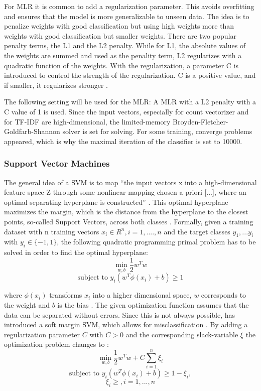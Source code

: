 \documentclass[12pt, a4paper, titlepage]{article}
\begin{document}
For \ac{MLR} it is common to add a regularization parameter. This avoids overfitting and ensures that the model is more generalizable to unseen data. The idea is to penalize weights with good classification but using high weights more than weights with good classification but smaller weights. There are two popular penalty terms, the L1 and the L2 penalty. While for L1, the absolute values of the weights are summed and used as the penality term, L2 regularizes with a quadratic function of the weights. With the regularization, a parameter C is introduced to control the strength of the regularization. C is a positive value, and if smaller, it regularizes stronger \citep{jurafsky2021}. 

The following setting will be used for the \ac{MLR}: A \ac{MLR} with a L2 penalty with a C value of 1 is used. Since the input vectors, especially for count vectorizer and for \ac{TF-IDF} are high-dimensional, the limited-memory Broyden-Fletcher-Goldfarb-Shannon solver is set for solving. For some training, converge problems appeared, which is why the maximal iteration of the classifier is set to 10000.

\subsubsection*{Support Vector Machines}
 The general idea of a \ac{SVM} is to map ``the input vectors x into a high-dimensional feature space Z through some nonlinear mapping chosen a priori [...], where an optimal separating hyperplane is constructed'' \citep[138]{Vapnik2000}. This optimal hyperplane maximizes the margin, which is the distance from the hyperplane to the closest points, so-called Support Vectors, across both classes \citep{Han2012}. Formally, given a training dataset with n training vectors $x_i \in R^n, i = 1,....,n$ and the target classes $y_1,...y_i$ with $y_i \in \{-1, 1\}$, the following quadratic programming primal problem has to be solved in order to find the optimal hyperplane:
\[\min_{w,b} \frac{1}{2}w^{T}w \] 
\[\text{subject to } y_i(w^T\phi(x_i)+b) \geq 1\]

where $\phi(x_i)$ transforms $x_i$ into a higher dimensional space, $w$ corresponds to the weight and $b$ is the bias \citep{Chang2001,Jordan2006}.
The given optimization function assumes that the data can be separated without errors. Since this is not always possible, \cite{Cortes1995} has introduced a soft margin \ac{SVM}, which allows for misclassification \citep{Vapnik2000}.
By adding a regularization parameter $C$ with $C > 0$ and the corresponding slack-variable $\xi$ the optimization problem changes to \citep{Chang2001, Han2012}: 
\[\min_{w,b} \frac{1}{2}w^{T}w + C \sum_{i=1}^n \xi_i \] 
\[\text{subject to } y_i(w^T\phi(x_i)+b) \geq 1 - \xi_i, \] 
\[\xi_i \geq, i = 1,...,n\]
\end{document}
